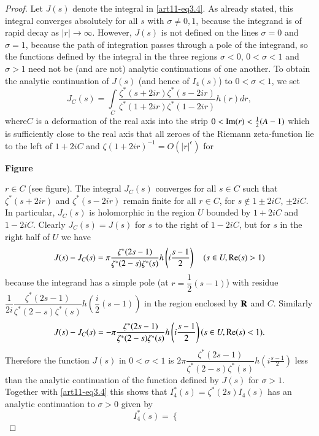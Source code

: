 \begin{proof}
Let $J(s)$ denote the integral in \eqref{art11-eq3.4}. As already stated, this integral converges absolutely for all $s$ with $\sigma \neq 0, 1$, because the integrand is of rapid decay as $|r| \to \infty$. However, $J(s)$ is not defined on the lines $\sigma =0$ and $\sigma =1$, because the path of integration passes through a pole of the integrand, so the functions defined by the integral in the three regions $\sigma < 0$, $0 < \sigma < 1$ and $ \sigma >1$ need not be (and are not) analytic continuations of one another. To obtain the analytic continuation of $J(s)$ (and hence of $I_4 (s)$) to $0< \sigma < 1$, we set 
$$
J_C (s) = \int\limits_C \frac{\zeta^\ast (s + 2 ir) \zeta^\ast (s - 2 ir)}{\zeta^\ast (1+ 2 ir) \zeta^\ast (1-2ir)} h(r) dr, 
$$
where\pageoriginale $C$ is a deformation of the real axis into the strip $0< \operatorname{Im} (r) <\frac{1}{2} (A -1)$ which is sufficiently close to the real axis that all zeroes of the Riemann zeta-function lie to the left of $1+ 2 iC$ and $\zeta(1+2 ir)^{-1} = O(|r|^\epsilon) $ for 
\begin{center}
{\bf Figure }
\end{center}
$r \in C$ (see figure). The integral $J_C (s)$ converges for all $s \in C$ such that $\zeta^\ast(s + 2 ir)$ and $\zeta^\ast (s - 2 ir)$ remain finite for all $r \in C$, \ie for $s \not\in 1 \pm 2 i C$, $\pm 2 i C$. In particular, $J_C (s)$ is holomorphic in the region $U$ bounded by $1+ 2 i C$ and $1 - 2 i C$. Clearly $J_C (s) = J(s)$ for $s$ to the right of $1 - 2i C$, but for $s$ in the right half of $U$ we have 
$$
J(s) - J_C (s) = \pi \frac{\zeta^\ast (2 s- 1)}{\zeta^\ast (2 -s ) \zeta^\ast (s)} h\left(i\frac{s-1}{2} \right) \quad (s \in U, \operatorname{Re} (s) >1)
$$
because the integrand has a simple pole (at $r = \dfrac{1}{2} (s-1)$) with residue $\dfrac{1}{2i} \dfrac{\zeta^\ast (2s-1)}{\zeta^\ast (2 -s) \zeta^\ast (s)} h(\dfrac{i}{2} (s-1))$ in the region enclosed by $\mathbf{R}$ and $C$. Similarly 
$$
J(s) - J_C (s)= - \pi \frac{\zeta^\ast (2s -1)}{\zeta^\ast (2 -s) \zeta^\ast (s)} h \left(i \frac{s-1}{2} \right) (s \in U , \operatorname{Re} (s) < 1).
$$
Therefore the function $J(s)$ in $0 < \sigma < 1$ is $2 \pi \dfrac{\zeta^\ast (2s -1)}{\zeta^\ast (2 -s) \zeta^\ast (s)} h \left(i\frac{s-1}{2} \right)$ less than the analytic continuation of the function defined by $J(s)$ for $\sigma>1$. Together with \eqref{art11-eq3.4} this shows that $I^\ast_4 (s) = \zeta^\ast (2s) I_4 (s)$ has an analytic continuation to $\sigma >0$ given by 
\begin{equation*}
I^\ast_4 (s) = 
\left\{ 
\begin{aligned}

\end{aligned}
\end{equation*}
\end{proof}
